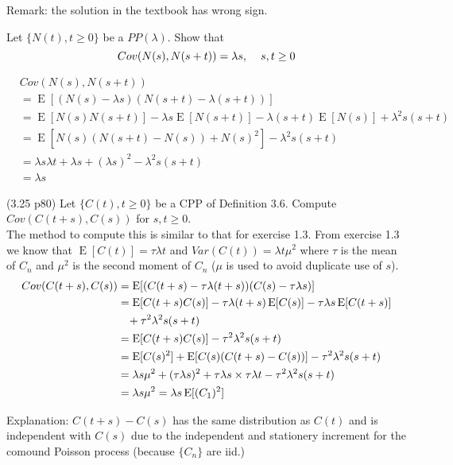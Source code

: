 \documentclass[  11pt]{article}
\newcommand{\e}{ \operatorname{E}}
\newcommand{\la}{\lambda}
\begin{document}
\begin{ExerciseList}
Remark: the solution in the textbook has  wrong sign.\\

\Exercise [origin={3.20, p80}] 

  Let $\{N(t), t\ge 0 \}$ be a $PP(\lambda)$. Show that 
$$Cov(N(s), N(s+t)) = \lambda s, \hspace{0.4cm}s,t \ge 0$$

\Answer
\[\begin{split}
&Cov(N(s),N(s+t)) \\
&= \e[(N(s)-\la s)(N(s+t)-\la (s+t))]\\
&= \e[N(s)N(s+t)]-\la s \e[N(s+t)]-\la(s+t)\e[N(s)]+\la^2s(s+t)\\
&= \e[N(s)(N(s+t)-N(s))+N(s)^2] - \la^2s(s+t)\\
&= \la s \la t + \la s + (\la s)^2 -\la^2 s(s+t)\\
&= \la s
\end{split}\]

\Exercise [origin={3.25, p80}] 

(3.25 p80) Let $\{C(t), t\ge 0 \}$ be a CPP of Definition 3.6. Compute $Cov(C(t+s),C(s))$ for $s,t\ge 0$.\\

\Answer
The method to compute this is similar to that for exercise 1.3. From exercise 1.3 we know that $\e[C(t)] = \tau \la t$ and $Var(C(t)) = \la t \mu^2$ where $\tau$ is the mean of $C_n$ and $\mu^2$ is the second moment of $C_n$ ($\mu$ is used to avoid duplicate use of $s$).
\[\begin{split}
Cov(C(t+s),C(s)) &= \e[(C(t+s)- \tau\la(t+s))(C(s)-\tau \la s)]\\
&= \e[C(t+s) C(s)] - \tau\la(t+s)\e[C(s)] - \tau\la s\e[C(t+s)]\\
&\hspace{0.3cm}+\tau^2\la^2 s(s+t)\\
&= \e[C(t+s)C(s)] - \tau^2\la^2 s(s+t)\\
&= \e[C(s)^2] + \e[C(s) (C(t+s)-C(s))] - \tau^2\la^2 s(s+t)\\
&= \la s \mu^2  + (\tau\la s)^2 + \tau\la s \times \tau \la t - \tau^2\la^2s(s+t)\\
&= \la s \mu^2 = \la s \e[(C_1)^2]
\end{split}\]

Explanation: $C(t+s)-C(s)$ has the same distribution as $C(t)$ and is independent with $C(s)$ due to the independent and stationery  increment for the comound Poisson process
(because $\{C_n\}$ are iid.)


\end{ExerciseList}
\end{document}

